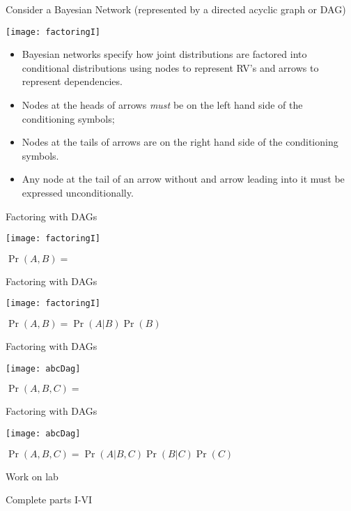 \documentclass[ignorenonframetext,]{beamer}
\providecommand{\tightlist}{%
  \setlength{\itemsep}{0pt}\setlength{\parskip}{0pt}}
\begin{document}
\begin{frame}{Consider a Bayesian Network (represented by a directed
acyclic graph or DAG)}

\centerline{\texttt{[image: factoringI]}}

\begin{itemize}
\tightlist
\item
  Bayesian networks specify how joint distributions are factored into
  conditional distributions using nodes to represent RV's and arrows to
  represent dependencies.
\item
  Nodes at the heads of arrows \emph{must} be on the left hand side of
  the conditioning symbols;
\item
  Nodes at the tails of arrows are on the right hand side of the
  conditioning symbols.
\item
  Any node at the tail of an arrow without and arrow leading into it
  must be expressed unconditionally.
\end{itemize}

\end{frame}

\begin{frame}{Factoring with DAGs}

\centerline{\texttt{[image: factoringI]}}

\(\Pr(A,B) =\)

\end{frame}

\begin{frame}{Factoring with DAGs}

\centerline{\texttt{[image: factoringI]}}

\(\Pr(A,B) = \Pr(A|B) \Pr(B)\)

\end{frame}

\begin{frame}{Factoring with DAGs}

\centerline{\texttt{[image: abcDag]}}

\(\Pr(A,B,C) =\)

\end{frame}

\begin{frame}{Factoring with DAGs}

\centerline{\texttt{[image: abcDag]}}

\(\Pr(A,B,C) = \Pr(A|B,C)\Pr(B|C)\Pr(C)\)

\end{frame}

\begin{frame}{Work on lab}

Complete parts I-VI

\end{frame}
\end{document}
